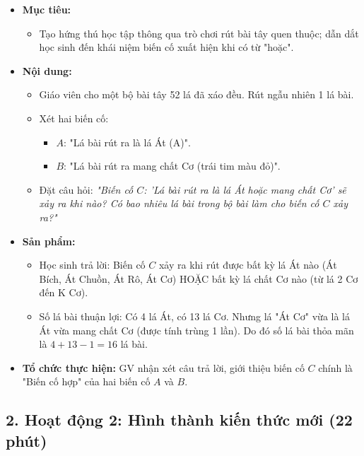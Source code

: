 \documentclass[12pt, a4paper]{article}
\begin{document}
\begin{itemize}[leftmargin=1.2cm]
    \item[a)] \textbf{Mục tiêu:}
    \begin{itemize}[leftmargin=0.6cm]
        \item Tạo hứng thú học tập thông qua trò chơi rút bài tây quen thuộc; dẫn dắt học sinh đến khái niệm biến cố xuất hiện khi có từ "hoặc".
    \end{itemize}

    \item[b)] \textbf{Nội dung:}
    \begin{itemize}[leftmargin=0.6cm]
        \item Giáo viên cho một bộ bài tây 52 lá đã xáo đều. Rút ngẫu nhiên 1 lá bài.
        \item Xét hai biến cố:
        \begin{itemize}
            \item $A$: "Lá bài rút ra là lá Át (A)".
            \item $B$: "Lá bài rút ra mang chất Cơ (trái tim màu đỏ)".
        \end{itemize}
        \item Đặt câu hỏi: \textit{"Biến cố $C$: 'Lá bài rút ra là lá Át hoặc mang chất Cơ' sẽ xảy ra khi nào? Có bao nhiêu lá bài trong bộ bài làm cho biến cố $C$ xảy ra?"}
    \end{itemize}

    \item[c)] \textbf{Sản phẩm:}
    \begin{itemize}[leftmargin=0.6cm]
        \item Học sinh trả lời: Biến cố $C$ xảy ra khi rút được bất kỳ lá Át nào (Át Bích, Át Chuồn, Át Rô, Át Cơ) HOẶC bất kỳ lá chất Cơ nào (từ lá 2 Cơ đến K Cơ).
        \item Số lá bài thuận lợi: Có 4 lá Át, có 13 lá Cơ. Nhưng lá "Át Cơ" vừa là lá Át vừa mang chất Cơ (được tính trùng 1 lần). Do đó số lá bài thỏa mãn là $4 + 13 - 1 = 16$ lá bài.
    \end{itemize}

    \item[d)] \textbf{Tổ chức thực hiện:} GV nhận xét câu trả lời, giới thiệu biến cố $C$ chính là "Biến cố hợp" của hai biến cố $A$ và $B$.
\end{itemize}

\subsection*{2. Hoạt động 2: Hình thành kiến thức mới (22 phút)}
\end{document}
